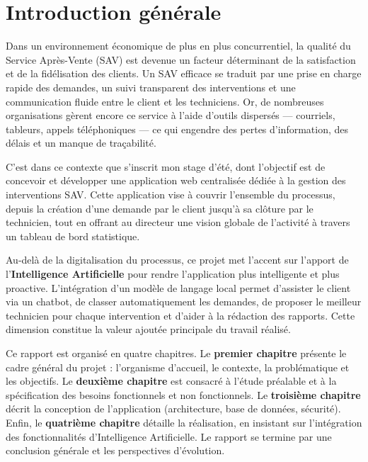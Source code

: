 
\chapter*{Introduction générale}

Dans un environnement économique de plus en plus concurrentiel, la qualité du Service Après-Vente (SAV) est devenue un facteur déterminant de la satisfaction et de la fidélisation des clients. Un SAV efficace se traduit par une prise en charge rapide des demandes, un suivi transparent des interventions et une communication fluide entre le client et les techniciens. Or, de nombreuses organisations gèrent encore ce service à l'aide d'outils dispersés — courriels, tableurs, appels téléphoniques — ce qui engendre des pertes d'information, des délais et un manque de traçabilité.

C'est dans ce contexte que s'inscrit mon stage d'été, dont l'objectif est de concevoir et développer une application web centralisée dédiée à la gestion des interventions SAV. Cette application vise à couvrir l'ensemble du processus, depuis la création d'une demande par le client jusqu'à sa clôture par le technicien, tout en offrant au directeur une vision globale de l'activité à travers un tableau de bord statistique.

Au-delà de la digitalisation du processus, ce projet met l'accent sur l'apport de l'\textbf{Intelligence Artificielle} pour rendre l'application plus intelligente et plus proactive. L'intégration d'un modèle de langage local permet d'assister le client via un chatbot, de classer automatiquement les demandes, de proposer le meilleur technicien pour chaque intervention et d'aider à la rédaction des rapports. Cette dimension constitue la valeur ajoutée principale du travail réalisé.

Ce rapport est organisé en quatre chapitres. Le \textbf{premier chapitre} présente le cadre général du projet : l'organisme d'accueil, le contexte, la problématique et les objectifs. Le \textbf{deuxième chapitre} est consacré à l'étude préalable et à la spécification des besoins fonctionnels et non fonctionnels. Le \textbf{troisième chapitre} décrit la conception de l'application (architecture, base de données, sécurité). Enfin, le \textbf{quatrième chapitre} détaille la réalisation, en insistant sur l'intégration des fonctionnalités d'Intelligence Artificielle. Le rapport se termine par une conclusion générale et les perspectives d'évolution.



